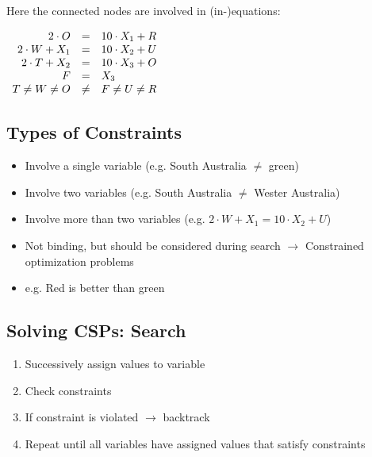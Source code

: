 \documentclass[
../../EiKI_Summary.tex,
]
{subfiles}
\begin{document}
Here the connected nodes are involved in (in-)equations:

\begin{csmb*}
    $\begin{array}{r c l}
        2\cdot O &=& 10 \cdot X_1 + R \\
        2\cdot W + X_1 &=& 10 \cdot X_2 + U \\
        2\cdot T + X_2 &=& 10 \cdot X_3 + O \\
        F &=& X_3 \\
        T \not= W \not= O &\not=& F \not= U \not= R
    \end{array}
    $
\end{csmb*}

\subsection{Types of Constraints}
\begin{itemize}
    \item {} Involve a single variable (e.g. South Australia $\not=$ green)
    \item {} Involve two variables (e.g. South Australia $\not=$ Wester Australia)
    \item {} Involve more than two variables (e.g. $2\cdot W + X_1 = 10 \cdot X_2 + U$)
\end{itemize}

\begin{itemize}
    \item Not binding, but should be considered during search 
    \subitem $\rightarrow$ Constrained optimization problems
    \item e.g. Red is better than green
\end{itemize}

\subsection{Solving CSPs: Search}
\begin{enumerate}
    \item Successively assign values to variable
    \item Check constraints
    \item If constraint is violated $\rightarrow$ backtrack
    \item Repeat until all variables have assigned values that satisfy constraints
\end{enumerate}
\end{document}
